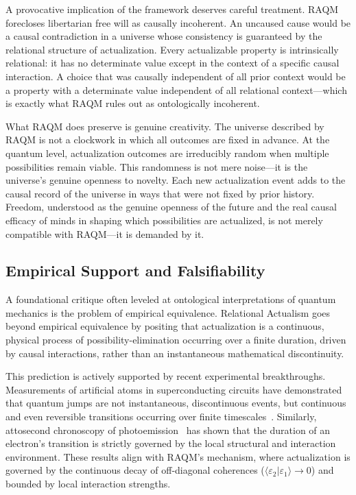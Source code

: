 \documentclass[11pt,a4paper]{article}
\theoremstyle{plain}
\theoremstyle{definition}
\theoremstyle{remark}
\newcommand{\braket}[2]{\langle #1 | #2 \rangle}
\begin{document}
A provocative implication of the framework deserves careful treatment. RAQM
forecloses libertarian free will as causally incoherent. An uncaused cause would
be a causal contradiction in a universe whose consistency is guaranteed by the
relational structure of actualization. Every actualizable property is intrinsically
relational: it has no determinate value except in the context of a specific causal
interaction. A choice that was causally independent of all prior context would be a
property with a determinate value independent of all relational context---which is
exactly what RAQM rules out as ontologically incoherent.

What RAQM does preserve is genuine creativity. The universe described by RAQM is
not a clockwork in which all outcomes are fixed in advance. At the quantum level,
actualization outcomes are irreducibly random when multiple possibilities remain
viable. This randomness is not mere noise---it is the universe's genuine openness
to novelty. Each new actualization event adds to the causal record of the universe
in ways that were not fixed by prior history. Freedom, understood as the genuine
openness of the future and the real causal efficacy of minds in shaping which
possibilities are actualized, is not merely compatible with RAQM---it is demanded
by it.

\subsection{Empirical Support and Falsifiability}
\label{sec:falsify}

A foundational critique often leveled at ontological interpretations of quantum
mechanics is the problem of empirical equivalence. Relational Actualism goes beyond
empirical equivalence by positing that actualization is a continuous, physical
process of possibility-elimination occurring over a finite duration, driven by
causal interactions, rather than an instantaneous mathematical discontinuity.

This prediction is actively supported by recent experimental breakthroughs.
Measurements of artificial atoms in superconducting circuits have demonstrated
that quantum jumps are not instantaneous, discontinuous events, but continuous and
even reversible transitions occurring over finite timescales~\citep{Minev2019}.
Similarly, attosecond chronoscopy of photoemission~\citep{Pazourek2015} has shown
that the duration of an electron's transition is strictly governed by the local
structural and interaction environment. These results align with RAQM's mechanism,
where actualization is governed by the continuous decay of off-diagonal coherences
($\braket{\varepsilon_2}{\varepsilon_1} \to 0$) and bounded by local interaction
strengths.
\end{document}
